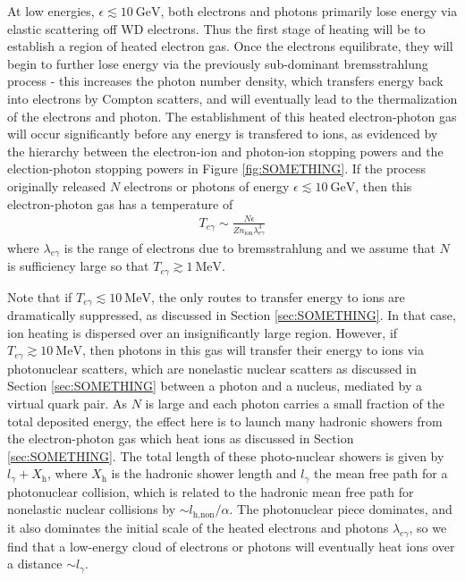\documentclass[twocolumn,showpacs,preprintnumbers,amsmath,amssymb,prd]{revtex4}
\newcommand{\GeV}{\text{GeV}}
\newcommand{\MeV}{\text{MeV}}
\begin{document}
At low energies, $\epsilon \lesssim 10~\GeV$, both electrons and photons primarily lose energy via elastic scattering off WD electrons.
Thus the first stage of heating will be to establish a region of heated electron gas.
Once the electrons equilibrate, they will begin to further lose energy via the previously sub-dominant bremsstrahlung process - this increases the photon number density, which transfers energy back into electrons by Compton scatters, and will eventually lead to the thermalization of the electrons and photon. 
The establishment of this heated electron-photon gas will occur significantly before any energy is transfered to ions, as evidenced by the hierarchy between the electron-ion and photon-ion stopping powers and the election-photon stopping powers in Figure \ref{fig:SOMETHING}.
If the process originally released $N$ electrons or photons of energy $\epsilon \lesssim 10~\GeV$, then this electron-photon gas has a temperature of 
\begin{align}
  T_{e\gamma} \sim \frac{N \epsilon}{Z n_\text{ion} \lambda_{e\gamma}^3}
\end{align}
where $\lambda_{e\gamma}$ is the range of electrons due to bremsstrahlung and we assume that $N$ is sufficiency large so that $T_{e\gamma} \gtrsim 1~\MeV$.  

Note that if $T_{e\gamma} \lesssim 10~\MeV$, the only routes to transfer energy to ions are dramatically suppressed, as discussed in Section \ref{sec:SOMETHING}. 
In that case, ion heating is dispersed over an insignificantly large region. 
However, if $T_{e\gamma} \gtrsim 10~\MeV$, then photons in this gas will transfer their energy to ions via photonuclear scatters, which are nonelastic nuclear scatters as discussed in Section \ref{sec:SOMETHING} between a photon and a nucleus, mediated by a virtual quark pair.   
As $N$ is large and each photon carries a small fraction of the total deposited energy, the effect here is to launch many hadronic showers from the electron-photon gas which heat ions as discussed in Section \ref{sec:SOMETHING}.  
The total length of these photo-nuclear showers is given by $l_\gamma + X_\text{h}$, where $X_\text{h}$ is the hadronic shower length and $l_\gamma$ the mean free path for a photonuclear collision, which is related to the hadronic mean free path for nonelastic nuclear collisions by $\sim l_\text{h,non}/\alpha$.
The photonuclear piece dominates, and it also dominates the initial scale of the heated electrons and photons $\lambda_{e\gamma}$, so we find that a low-energy cloud of electrons or photons will eventually heat ions over a distance $\sim l_\gamma$.
\end{document}
